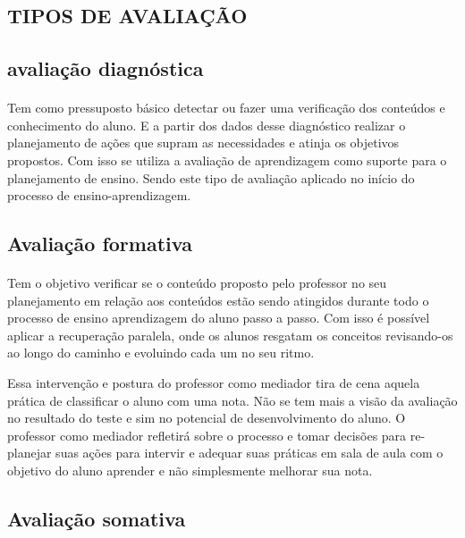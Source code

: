 	\subsection{TIPOS DE AVALIAÇÃO}
	\paragraph{}
	\subsection{avaliação diagnóstica}
	\paragraph{}
	    Tem como pressuposto básico detectar ou fazer uma verificação dos conteúdos e conhecimento do aluno. E a partir dos dados desse diagnóstico realizar o planejamento de ações que supram as necessidades e atinja os objetivos propostos. Com isso se utiliza a avaliação de aprendizagem como suporte para o planejamento de ensino. Sendo este tipo de avaliação aplicado no início do processo de ensino-aprendizagem.
	\subsection{Avaliação formativa}
	\paragraph{}
	    Tem o objetivo verificar se o conteúdo proposto pelo professor no seu planejamento em relação aos conteúdos estão sendo atingidos durante todo o processo de ensino aprendizagem do aluno passo a passo. Com isso é possível aplicar a recuperação paralela, onde os alunos resgatam os conceitos revisando-os ao longo do caminho e evoluindo cada um no seu ritmo.
	\par
	    Essa intervenção e postura do professor como mediador tira de cena aquela prática de classificar o aluno com uma nota. Não se tem mais a visão da avaliação no resultado do teste e sim no potencial de desenvolvimento do aluno. O professor como mediador refletirá sobre o processo e tomar decisões para re-planejar suas ações para intervir e adequar suas práticas em sala de aula com o objetivo do aluno aprender e não simplesmente melhorar sua nota.
	\subsection{Avaliação somativa}
